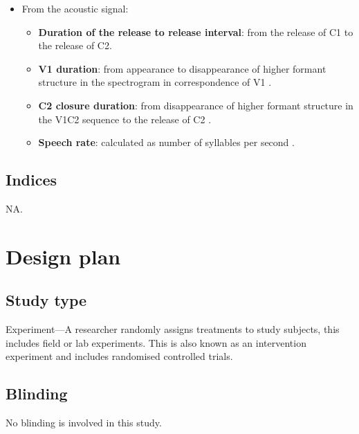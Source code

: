 \documentclass[11pt,]{article}
\providecommand{\tightlist}{%
  \setlength{\itemsep}{0pt}\setlength{\parskip}{0pt}}
\begin{document}
\begin{itemize}
\tightlist
\item
  From the acoustic signal:

  \begin{itemize}
  \tightlist
  \item
    \textbf{Duration of the release to release interval}: from the
    release of C1 to the release of C2.
  \item
    \textbf{V1 duration}: from appearance to disappearance of higher
    formant structure in the spectrogram in correspondence of V1
    \citep{machac2009}.
  \item
    \textbf{C2 closure duration}: from disappearance of higher formant
    structure in the V1C2 sequence to the release of C2
    \citep{machac2009}.
  \item
    \textbf{Speech rate}: calculated as number of syllables per second
    \citep[\texttt{n\ of\ syllables\ in\ the\ sentence\ /\ sentence\ duration},][]{plug2018}.
  \end{itemize}
\end{itemize}

\hypertarget{indices}{%
\subsection{Indices}\label{indices}}

NA.

\hypertarget{design-plan}{%
\section{Design plan}\label{design-plan}}

\hypertarget{study-type}{%
\subsection{Study type}\label{study-type}}

Experiment---A researcher randomly assigns treatments to study subjects,
this includes field or lab experiments. This is also known as an
intervention experiment and includes randomised controlled trials.

\hypertarget{blinding}{%
\subsection{Blinding}\label{blinding}}

No blinding is involved in this study.
\end{document}
